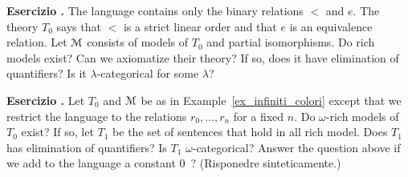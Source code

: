 \documentclass[10pt]{article}
\def\M{\EuScript M}
\newcounter{ex}
\newenvironment{exercise}{\clearpage\addtocounter{ex}{1}\textbf{Esercizio \theex.\quad}}{}
\begin{document}
\begin{exercise}
  The language contains only the binary relations $<$ and $e$.
  The theory $T_0$ says that $<$ is a strict linear order and that $e$ is an equivalence relation.
  Let $\M$ consists of models of $T_0$ and partial isomorphisms.
  Do rich models exist? Can we axiomatize their theory? If so, does it have elimination of quantifiers? Is it $\lambda$-categorical for some $\lambda$?  
\end{exercise}


\begin{exercise}
  Let $T_0$ and $\M$ be as in Example~\ref{ex_infiniti_colori} except that we restrict the language to the relations $r_0,\dots,r_n$ for a fixed $n$.
  Do $\omega$-rich models of $T_0$ exist? 
  If so, let $T_1$ be the set of sentences that hold in all rich model.
  Does $T_1$ has elimination of quantifiers?
  Is $T_1$ $\omega$-categorical? 
  Answer the question above if we add to the language a constant $0$~?
  (Risponedre sinteticamente.)
\end{exercise}
\end{document}
